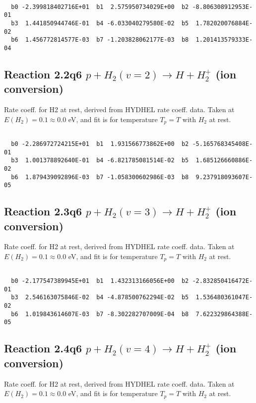 \documentclass[12pt,dvipdfmx]{article}
\begin{document}
\begin{small}\begin{verbatim}

  b0 -2.399818402716E+01  b1  2.575950734029E+00  b2 -8.806308912953E-01
  b3  1.441850944746E-01  b4 -6.033040279580E-02  b5  1.782020076884E-02
  b6  1.456772814577E-03  b7 -1.203828062177E-03  b8  1.201413579333E-04

\end{verbatim}\end{small}

\newpage
\subsection{
Reaction 2.2q6
$ p + H_2(v=2) \rightarrow H + H_2^+$ (ion conversion)
}
Rate coeff. for H2 at rest, derived from HYDHEL rate coeff. data.
Taken at $E(H_2) = 0.1 \approx 0.0$ eV,  and fit is for temperature $T_p=T$ with $H_2$ at rest.

\begin{small}\begin{verbatim}

  b0 -2.286972724215E+01  b1  1.931566773862E+00  b2 -5.165768345408E-01
  b3  1.001378892640E-01  b4 -6.821785081514E-02  b5  1.685126660886E-02
  b6  1.879439092896E-03  b7 -1.058300602986E-03  b8  9.237918093607E-05

\end{verbatim}\end{small}

\newpage
\subsection{
Reaction 2.3q6
$ p + H_2(v=3) \rightarrow H + H_2^+$ (ion conversion)
}
Rate coeff. for H2 at rest, derived from HYDHEL rate coeff. data.
Taken at $E(H_2) = 0.1 \approx 0.0$ eV,  and fit is for temperature $T_p=T$ with $H_2$ at rest.

\begin{small}\begin{verbatim}

  b0 -2.177547389945E+01  b1  1.432313166056E+00  b2 -2.832850416472E-01
  b3  2.546163075846E-02  b4 -4.878500762294E-02  b5  1.536480361047E-02
  b6  1.019843614607E-03  b7 -8.302282707009E-04  b8  7.622329864388E-05

\end{verbatim}\end{small}

\newpage
\subsection{
Reaction 2.4q6
$ p + H_2(v=4) \rightarrow H + H_2^+$ (ion conversion)
}
Rate coeff. for H2 at rest, derived from HYDHEL rate coeff. data.
Taken at $E(H_2) = 0.1 \approx 0.0$ eV,  and fit is for temperature $T_p=T$ with $H_2$ at rest.
\end{document}
